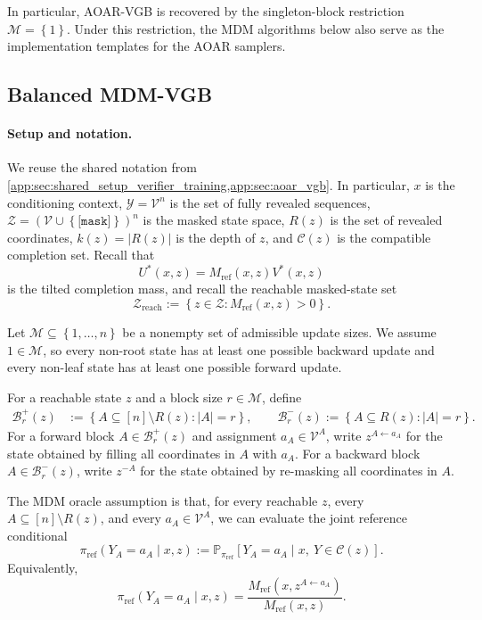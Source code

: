 \documentclass{article}
\numberwithin{theorem}{section}
\numberwithin{proposition}{section}
\numberwithin{corollary}{section}
\numberwithin{lemma}{section}
\numberwithin{conjecture}{section}
\numberwithin{remark}{section}
\numberwithin{definition}{section}
\numberwithin{assumption}{section}
\numberwithin{example}{section}
\newcommand{\calB}{{\mathcal{B}}}
\newcommand{\calC}{{\mathcal{C}}}
\newcommand{\calM}{{\mathcal{M}}}
\newcommand{\calV}{{\mathcal{V}}}
\newcommand{\calY}{{\mathcal{Y}}}
\newcommand{\calZ}{{\mathcal{Z}}}
\newcommand{\bbP}{\mathbb{P}}
\newcommand{\lbra}[1]{\left[#1\right]}
\newcommand{\mbra}[1]{\left\{#1\right\}}
\newcommand{\sbra}[1]{\left(#1\right)}
\newcommand{\abs}[1]{\left| #1\right|}
\providecommand{\mask}{\texttt{[mask]}}
\providecommand{\base}{\pi_{\mathrm{ref}}}
\begin{document}
In particular, AOAR-VGB is recovered by the singleton-block restriction
$\calM=\mbra{1}$. Under this restriction, the MDM algorithms below also serve
as the implementation templates for the AOAR samplers.

\subsection{Balanced MDM-VGB}
\label{app:subsec:balanced_mdm_vgb}

\paragraph{Setup and notation.}
\label{app:subsubsec:balanced_mdm_setup}
We reuse the shared notation from \cref{app:sec:shared_setup_verifier_training,app:sec:aoar_vgb}. In particular, $x$ is the conditioning context, $\calY=\calV^n$ is the set of fully revealed sequences, $\calZ=\sbra{\calV\cup\mbra{\mask}}^n$ is the masked state space, $R(z)$ is the set of revealed coordinates, $k(z)=\abs{R(z)}$ is the depth of $z$, and $\calC(z)$ is the compatible completion set. Recall that
\begin{equation*}
    U^*(x,z)=M_{\mathrm{ref}}(x,z)V^*(x,z)
\end{equation*}
is the tilted completion mass, and recall the reachable masked-state set
\begin{equation*}
    \calZ_{\mathrm{reach}}:=\mbra{z\in\calZ: M_{\mathrm{ref}}(x,z)>0}.
\end{equation*}

Let $\calM\subseteq\mbra{1,\dots,n}$ be a nonempty set of admissible update sizes. We assume $1\in\calM$, so every non-root state has at least one possible backward update and every non-leaf state has at least one possible forward update.

For a reachable state $z$ and a block size $r\in\calM$, define
\begin{align*}
    \calB_r^+(z)&:=\mbra{A\subseteq\lbra{n}\setminus R(z): \abs{A}=r},\qquad
    \calB_r^-(z):=\mbra{A\subseteq R(z): \abs{A}=r}.
\end{align*}
For a forward block $A\in\calB_r^+(z)$ and assignment $a_A\in\calV^A$, write $z^{A\leftarrow a_A}$ for the state obtained by filling all coordinates in $A$ with $a_A$. For a backward block $A\in\calB_r^-(z)$, write $z^{-A}$ for the state obtained by re-masking all coordinates in $A$.

The MDM oracle assumption is that, for every reachable $z$, every $A\subseteq\lbra{n}\setminus R(z)$, and every $a_A\in\calV^A$, we can evaluate the joint reference conditional
\begin{equation*}
    \base(Y_A=a_A\mid x,z):=\bbP_{\base}\lbra{Y_A=a_A\mid x,\ Y\in\calC(z)}.
\end{equation*}
Equivalently,
\begin{equation*}
    \base(Y_A=a_A\mid x,z)=\frac{M_{\mathrm{ref}}(x,z^{A\leftarrow a_A})}{M_{\mathrm{ref}}(x,z)}.
\end{equation*}
\end{document}
